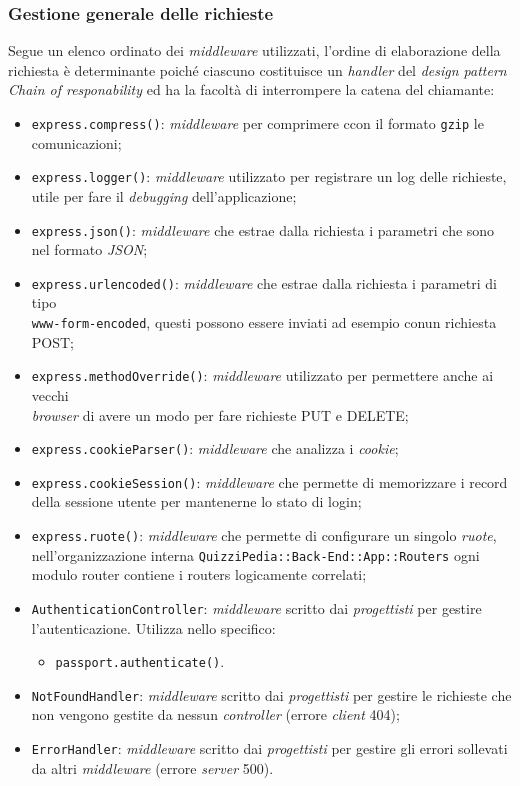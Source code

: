 \subsubsection{Gestione generale delle richieste}
Segue un elenco ordinato dei \textit{middleware} utilizzati, l'ordine di elaborazione della richiesta è determinante poiché ciascuno costituisce un \textit{handler} del \textit{design pattern} \textit{Chain of responability} ed ha la facoltà di interrompere la catena del chiamante:

\begin{itemize}
	\item \texttt{express.compress()}: \textit{middleware} per comprimere ccon il formato \texttt{gzip} le comunicazioni;
	\item \texttt{express.logger()}: \textit{middleware} utilizzato per registrare un log delle richieste, utile per fare il \textit{debugging} dell'applicazione;
	\item \texttt{express.json()}: \textit{middleware} che estrae dalla richiesta i parametri che sono nel formato \textit{JSON};
	\item \texttt{express.urlencoded()}: \textit{middleware} che estrae dalla richiesta i parametri di tipo \\ \texttt{www-form-encoded}, questi possono essere inviati ad esempio conun richiesta POST;
	\item \texttt{express.methodOverride()}: \textit{middleware} utilizzato per permettere anche ai vecchi \\ \textit{browser} di avere un modo per fare richieste PUT e DELETE;
	\item \texttt{express.cookieParser()}: \textit{middleware} che analizza i \textit{cookie};
	\item \texttt{express.cookieSession()}: \textit{middleware} che permette di memorizzare i record della sessione utente per mantenerne lo stato di login;
	\item \texttt{express.ruote()}: \textit{middleware} che permette di configurare un singolo \textit{ruote}, nell'organizzazione interna \texttt{QuizziPedia::Back-End::App::Routers} ogni modulo router contiene i routers logicamente correlati;
	\item \texttt{AuthenticationController}: \textit{middleware} scritto dai \textit{progettisti} per gestire l'autenticazione. Utilizza nello specifico:
			\begin{itemize}
				\item \texttt{passport.authenticate()}.
			\end{itemize}
	\item \texttt{NotFoundHandler}: \textit{middleware} scritto dai \textit{progettisti} per gestire le richieste che non vengono gestite da nessun \textit{controller} (errore \textit{client} 404);
	\item \texttt{ErrorHandler}: \textit{middleware} scritto dai \textit{progettisti} per gestire gli errori sollevati da altri \textit{middleware} (errore \textit{server} 500).
\end{itemize}

